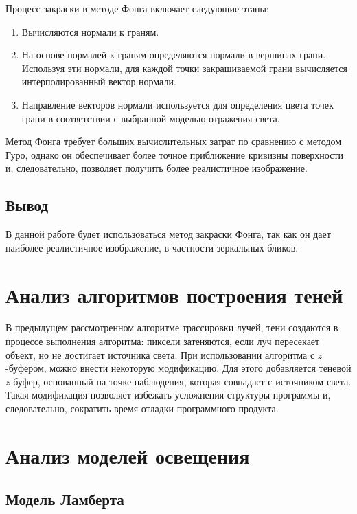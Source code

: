 Процесс закраски в методе Фонга включает следующие этапы:
\begin{enumerate}[label=\arabic*)]
	\item Вычисляются нормали к граням.
	\item На основе нормалей к граням определяются нормали в вершинах грани. Используя эти нормали, для каждой точки закрашиваемой грани вычисляется интерполированный вектор нормали.
	\item Направление векторов нормали используется для определения цвета точек грани в соответствии с выбранной моделью отражения света.
\end{enumerate}

Метод Фонга требует больших вычислительных затрат по сравнению с методом Гуро, однако он обеспечивает более точное приближение кривизны поверхности и, следовательно, позволяет получить более реалистичное изображение.

\subsection{Вывод}

В данной работе будет использоваться метод закраски Фонга, так как он дает наиболее реалистичное изображение, в частности зеркальных бликов.

\section{Анализ алгоритмов построения теней}

В предыдущем рассмотренном алгоритме трассировки лучей, тени создаются в процессе выполнения алгоритма: пиксели затеняются, если луч пересекает объект, но не достигает источника света.
При использовании алгоритма с $z$-буфером, можно внести некоторую модификацию. Для этого добавляется теневой $z$-буфер, основанный на точке наблюдения, которая совпадает с источником света.
Такая модификация позволяет избежать усложнения структуры программы и, следовательно, сократить время отладки программного продукта.

\section{Анализ моделей освещения}

\subsection{Модель Ламберта}

